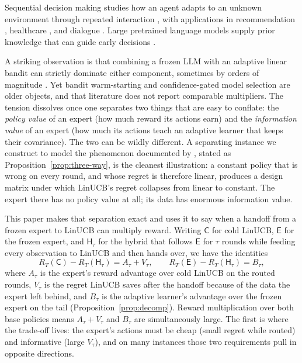 \documentclass{article}
\theoremstyle{definition}
\theoremstyle{remark}
\theoremstyle{remark}
\newcommand{\Cold}{\mathsf{C}}
\newcommand{\Exp}{\mathsf{E}}
\newcommand{\Hyb}{\mathsf{H}}
\begin{document}
Sequential decision making studies how an agent adapts to an unknown
environment through repeated interaction \cite{zhu2022largeaction,zhu2022contextual},
with applications in recommendation \cite{li2010contextual,agarwal2016making},
healthcare \cite{tewari2017ads,svensson2023sequential}, and dialogue
\cite{li2016deep}. Large pretrained language models supply prior knowledge that
can guide early decisions
\cite{brown2020language,ouyang2022training,achiam2023gpt,
alamdari2024jumpstarting,abbasiyadkori2024believe}.

A striking observation is that combining a frozen LLM with an adaptive linear
bandit can strictly dominate either component, sometimes by orders of magnitude
\cite{chen2024llmdecision,huangcontextual}. Yet bandit warm-starting
\cite{bastani2021mostly,zhang2019warm} and confidence-gated model selection
\cite{auer2002nonstochastic,agarwal2017corralling,pacchiano2020model} are older
objects, and that literature does not report comparable multipliers. The
tension dissolves once one separates two things that are easy to conflate:
the \emph{policy value} of an expert (how much reward its actions earn) and
the \emph{information value} of an expert (how much its actions teach an
adaptive learner that keeps their covariance). The two can be wildly
different. A separating instance we construct to model the phenomenon
documented by \cite{chen2024llmdecision}, stated as
Proposition~\ref{prop:three-way}, is the cleanest illustration:
a constant policy that is wrong on every round, and whose regret is therefore
linear, produces a design matrix under which LinUCB's regret collapses from
linear to constant. The expert there has no policy value at all; its data has
enormous information value.

This paper makes that separation exact and uses it to say when a handoff from
a frozen expert to LinUCB can multiply reward. Writing $\Cold$ for cold LinUCB,
$\Exp$ for the frozen expert, and $\Hyb_\tau$ for the hybrid that follows
$\Exp$ for $\tau$ rounds while feeding every observation to LinUCB and then
hands over, we have the identities
\[
R_T(\Cold)-R_T(\Hyb_\tau)=A_\tau+V_\tau,
\qquad
R_T(\Exp)-R_T(\Hyb_\tau)=B_\tau,
\]
where $A_\tau$ is the expert's reward advantage over cold LinUCB on the routed
rounds, $V_\tau$ is the regret LinUCB saves after the handoff because of the
data the expert left behind, and $B_\tau$ is the adaptive learner's advantage
over the frozen expert on the tail (Proposition~\ref{prop:decomp}). Reward
multiplication over both base policies means $A_\tau+V_\tau$ and $B_\tau$ are
simultaneously large. The first is where the trade-off lives: the expert's
actions must be cheap (small regret while routed) and informative (large
$V_\tau$), and on many instances those two requirements pull in opposite
directions.
\end{document}
